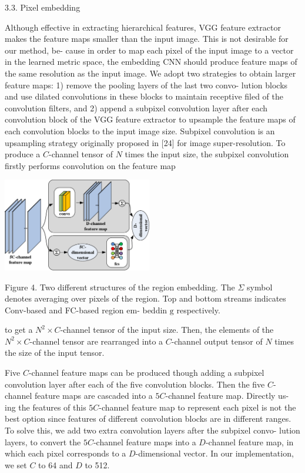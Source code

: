 \documentclass[a4paper,10pt]{article}
\begin{document}
3.3. Pixel embedding

Although effective in extracting hierarchical features, VGG feature extractor makes the feature maps smaller than the input image. This is not desirable for our method, be- cause in order to map each pixel of the input image to a vector in the learned metric space, the embedding CNN should produce feature maps of the same resolution as the input image. We adopt two strategies to obtain larger feature maps: 1) remove the pooling layers of the last two convo- lution blocks and use dilated convolutions in these blocks to maintain receptive filed of the convolution filters, and 2) append a subpixel convolution layer after each convolution block of the VGG feature extractor to upsample the feature maps of each convolution blocks to the input image size. Subpixel convolution is an upsampling strategy originally proposed in [24] for image super-resolution. To produce a $C$-channel tensor of $N$ times the input size, the subpixel convolution firstly performs convolution on the feature map
\begin{center}
\includegraphics[width=65.02mm,height=40.64mm]{./zengyu_images/image009.eps}
\end{center}
Figure 4. Two different structures of the region embedding. The $\Sigma$ symbol denotes averaging over pixels of the region. Top and bottom streams indicates Conv-based and FC-based region em- beddin $\mathrm{g}$ respectively.

to get a $N^{2}\times C$-channel tensor of the input size. Then, the elements of the $N^{2}\times C$-channel tensor are rearranged into a $C$-channel output tensor of $N$ times the size of the input tensor.

Five $C$-channel feature maps can be produced though adding a subpixel convolution layer after each of the five convolution blocks. Then the five $C$-channel feature maps are cascaded into a $5C$-channel feature map. Directly us- ing the features of this $5C$-channel feature map to represent each pixel is not the best option since features of different convolution blocks are in different ranges. To solve this, we add two extra convolution layers after the subpixel convo- lution layers, to convert the $5C$-channel feature maps into a $D$-channel feature map, in which each pixel corresponds to a $D$-dimensional vector. In our implementation, we set $C$ to 64 and $D$ to 512.
\end{document}
